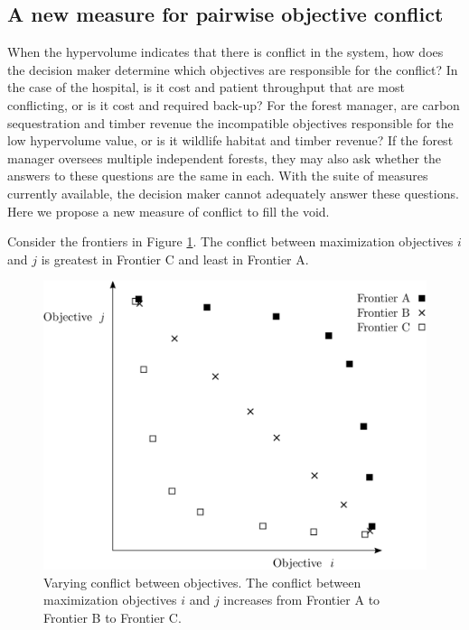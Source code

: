 \subsection{A new measure for pairwise objective conflict}
\label{sec:newConflictMetric}
When the hypervolume indicates that there is conflict in the system, how does the decision maker determine which objectives are responsible for the conflict? In the case of the hospital, is it cost and patient throughput that are most conflicting, or is it cost and required back-up? For the forest manager, are carbon sequestration and timber revenue the incompatible objectives responsible for the low hypervolume value, or is it wildlife habitat and timber revenue? If the forest manager oversees multiple independent forests, they may also ask whether the answers to these questions are the same in each. With the suite of measures currently available, the decision maker cannot adequately answer these questions. Here we propose a new measure of conflict to fill the void.

Consider the frontiers in Figure \ref{fig:ConflictVariesExample}. The conflict between maximization objectives $i$ and $j$ is greatest in Frontier C and least in Frontier A.
\begin{figure}[ht]
\centering
\includegraphics[width=.6\textwidth]{../images/ConflictVariesExample}
\caption[Example of varying conflict between objectives]{Varying conflict between objectives. The conflict between maximization objectives $i$ and $j$ increases from Frontier A to Frontier B to Frontier C.}
\label{fig:ConflictVariesExample}
\end{figure}

